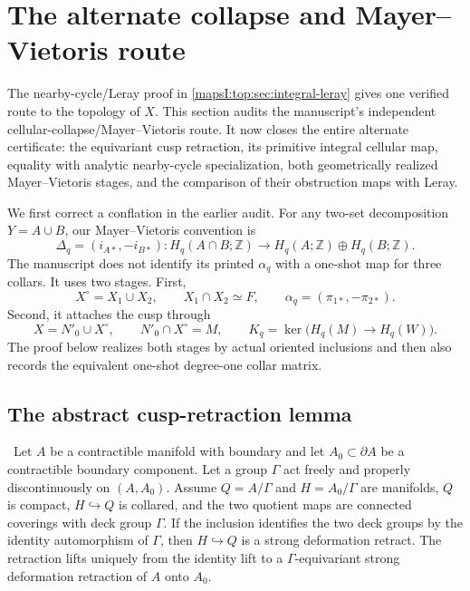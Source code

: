 \section{The alternate collapse and Mayer--Vietoris route}

The nearby-cycle/Leray proof in \cref{mapsI:top:sec:integral-leray} gives one verified
route to the topology of $X$.  This section audits the manuscript's independent
cellular-collapse/Mayer--Vietoris route.  It now closes the entire alternate
certificate: the equivariant cusp retraction, its primitive integral cellular
map, equality with analytic nearby-cycle specialization, both geometrically
realized Mayer--Vietoris stages, and the comparison of their obstruction maps
with Leray.

We first correct a conflation in the earlier audit.  For any two-set
decomposition $Y=A\cup B$, our Mayer--Vietoris convention is
\[
\Delta_q=(i_{A*},-i_{B*}):
H_q(A\cap B;\mathbb Z)\longrightarrow
H_q(A;\mathbb Z)\oplus H_q(B;\mathbb Z).
\tag{TM.4.1}
\]
The manuscript does not identify its printed $\alpha_q$ with a one-shot map
for three collars.  It uses two stages.  First,
\[
X^\circ=X_1\cup X_2,
\qquad X_1\cap X_2\simeq F,
\qquad
\alpha_q=(\pi_{1*},-\pi_{2*}).
\tag{TM.4.2}
\]
Second, it attaches the cusp through
\[
X=N'_0\cup X^\circ,
\qquad N'_0\cap X^\circ=M,
\qquad
K_q=\ker\bigl(H_q(M)\to H_q(W)\bigr).
\tag{TM.4.3}
\]
The proof below realizes both stages by actual oriented inclusions and then
also records the equivalent one-shot degree-one collar matrix.

\subsection{The abstract cusp-retraction lemma}

\begin{proposition}\label{mapsI:top:prop:topological-spine}
\ Let $A$ be a contractible manifold with boundary and let
$A_0\subset\partial A$ be a contractible boundary component.  Let a
group $\Gamma$ act freely and properly discontinuously on $(A,A_0)$.  Assume
$Q=A/\Gamma$ and $H=A_0/\Gamma$ are manifolds, $Q$ is compact,
$H\hookrightarrow Q$ is collared, and the two quotient maps are connected
coverings with deck group $\Gamma$.  If the inclusion identifies the two
deck groups by the identity automorphism of $\Gamma$, then
$H\hookrightarrow Q$ is a strong deformation retract.  The retraction lifts
uniquely from the identity lift to a $\Gamma$-equivariant strong deformation
retraction of $A$ onto $A_0$.
\end{proposition}

